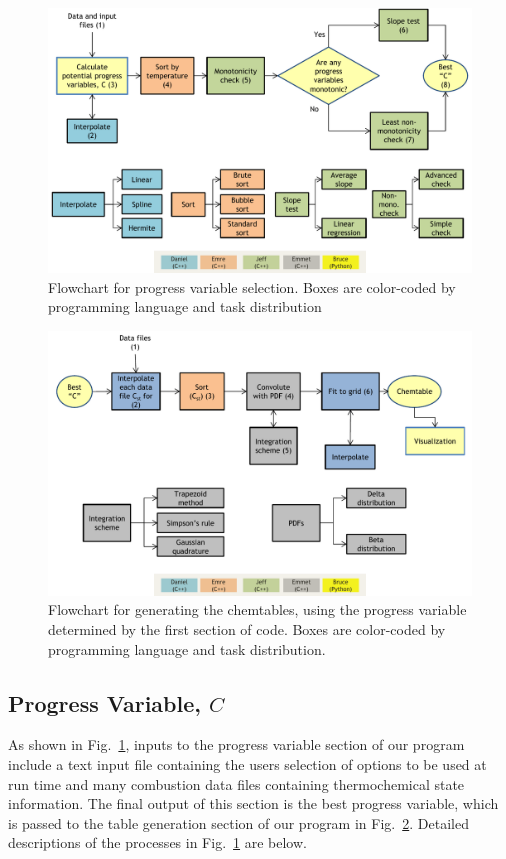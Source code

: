 \documentclass[11pt]{article}
\begin{document}
\begin{figure} [h]
\centering
\includegraphics[width=\textwidth]{diagram_1_shortened_v4}
\caption{\label{fig:flow1} Flowchart for progress variable selection. Boxes are color-coded by programming language and task distribution}
\end{figure}

\begin{figure} [h]
\centering
\includegraphics[width=\textwidth]{diagram_2_shortened_v4}
\caption{\label{fig:flow2} Flowchart for generating the chemtables, using the progress variable  determined by the first section of code. Boxes are color-coded by programming language and task distribution.}
\end{figure}

\subsection{Progress Variable, $C$}
As shown in Fig.~\ref{fig:flow1}, inputs to the progress variable
section of our program include a text input file containing the user\textquotesingle s
selection of options to be used at run time and many combustion
data files containing thermochemical state information. The final
output of this section is the best progress variable, which is
passed to the table generation section of our program in
Fig.~\ref{fig:flow2}. Detailed descriptions of the processes in
Fig.~\ref{fig:flow1} are below.
\end{document}
